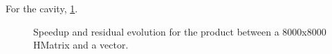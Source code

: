 For the cavity, \ref{fig:cavity_results}.

\begin{figure}[h!]
    \centering
    
    \caption{Speedup and residual evolution for the product between a 8000x8000 HMatrix and a vector.}
    \label{fig:cavity_results}
\end{figure}
